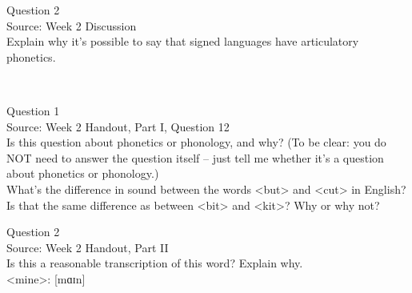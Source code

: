 \documentclass[12pt]{article}
\begin{document}
\newpage

{\large Question 2}\\

Source: Week 2 Discussion\\

Explain why it's possible to say that signed languages have articulatory phonetics.\\


\newpage

\begin{center}
\textbf{{\color{red}{\HUGE END OF EXAM}}}\\

\end{center}
\newpage

\begin{center}
\textbf{{\color{blue}{\HUGE START OF EXAM\\}}}

\textbf{{\color{blue}{\HUGE Student ID: 11196\\}}}

\textbf{{\color{blue}{\HUGE 4:30\\}}}

\end{center}
\newpage

{\large Question 1}\\

Source: Week 2 Handout, Part I, Question 12\\

Is this question about phonetics or phonology, and why? (To be clear: you do NOT need to answer the question itself -- just tell me whether it's a question about phonetics or phonology.)\\

What’s the difference in sound between the words <but> and <cut> in English? Is that the same difference as between <bit> and <kit>? Why or why not?


\newpage

{\large Question 2}\\

Source: Week 2 Handout, Part II\\

Is this a reasonable transcription of this word? Explain why.\\

<mine>: {[mɑɪn]}


\newpage

\begin{center}
\textbf{{\color{red}{\HUGE END OF EXAM}}}\\

\end{center}
\newpage
\end{document}
